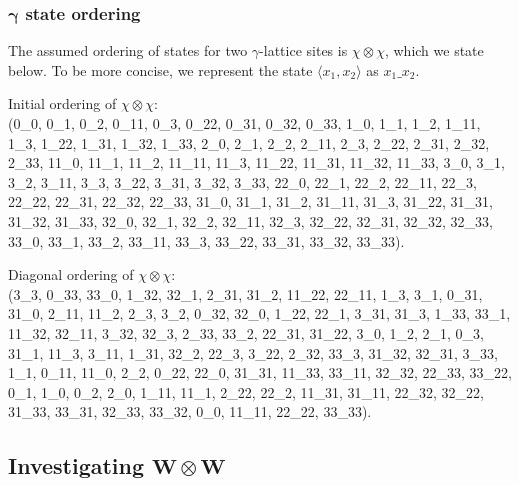 \documentclass[pdftex]{sigma}
\numberwithin{equation}{section}
\theoremstyle{definition}
\begin{document}
\subsubsection[gamma state ordering]{$\boldsymbol{\gamma}$ state ordering}
The assumed ordering of states for two $\gamma$-lattice sites is $\chi \otimes \chi$, which we state below. To be more concise, we represent the state $\langle x_1,x_2 \rangle$ as $x_1\_x_2$.

Initial ordering of $\chi \otimes \chi$:\\
(0\_0, 0\_1, 0\_2, 0\_11, 0\_3, 0\_22, 0\_31, 0\_32, 0\_33, 1\_0, 1\_1, 1\_2, 1\_11, 1\_3, 1\_22, 1\_31, 1\_32, 1\_33, 2\_0, 2\_1, 2\_2, 2\_11, 2\_3, 2\_22, 2\_31, 2\_32, 2\_33, 11\_0, 11\_1, 11\_2, 11\_11, 11\_3, 11\_22, 11\_31, 11\_32, 11\_33, 3\_0, 3\_1, 3\_2, 3\_11, 3\_3, 3\_22, 3\_31, 3\_32, 3\_33, 22\_0, 22\_1, 22\_2, 22\_11, 22\_3, 22\_22, 22\_31, 22\_32, 22\_33, 31\_0, 31\_1, 31\_2, 31\_11, 31\_3, 31\_22, 31\_31, 31\_32, 31\_33, 32\_0, 32\_1, 32\_2, 32\_11, 32\_3, 32\_22, 32\_31, 32\_32, 32\_33, 33\_0, 33\_1, 33\_2, 33\_11, 33\_3, 33\_22, 33\_31, 33\_32, 33\_33).

Diagonal ordering of $\chi \otimes \chi$:\\
 (3\_3, 0\_33, 33\_0, 1\_32, 32\_1, 2\_31, 31\_2, 11\_22, 22\_11, 1\_3, 3\_1, 0\_31, 31\_0, 2\_11, 11\_2, 2\_3, 3\_2, 0\_32, 32\_0, 1\_22, 22\_1, 3\_31, 31\_3, 1\_33, 33\_1, 11\_32, 32\_11, 3\_32, 32\_3, 2\_33, 33\_2, 22\_31, 31\_22, 3\_0, 1\_2, 2\_1, 0\_3, 31\_1, 11\_3, 3\_11, 1\_31, 32\_2, 22\_3, 3\_22, 2\_32, 33\_3, 31\_32, 32\_31, 3\_33, 1\_1, 0\_11, 11\_0, 2\_2, 0\_22, 22\_0, 31\_31, 11\_33, 33\_11, 32\_32, 22\_33, 33\_22, 0\_1, 1\_0, 0\_2, 2\_0, 1\_11, 11\_1, 2\_22, 22\_2, 11\_31, 31\_11, 22\_32, 32\_22, 31\_33, 33\_31, 32\_33, 33\_32, 0\_0, 11\_11, 22\_22, 33\_33).

\subsection[Investigating W tensor W]{Investigating $\boldsymbol{W\otimes W}$}
\end{document}
